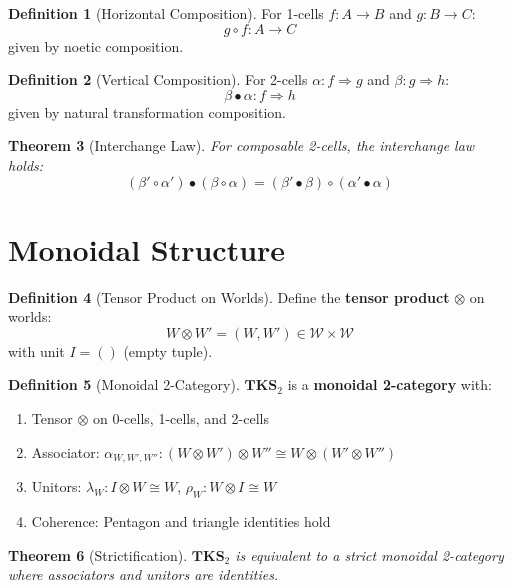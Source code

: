 \documentclass[11pt,twoside,openright]{book}
\theoremstyle{definition}
\newtheorem{definition}{Definition}[chapter]
\theoremstyle{plain}
\newtheorem{theorem}[definition]{Theorem}
\theoremstyle{remark}
\newcommand{\Worlds}{\mathcal{W}}
\begin{document}
\begin{definition}[Horizontal Composition]
\label{def:horizontal-comp}
For 1-cells $f : A \to B$ and $g : B \to C$:
\[
g \circ f : A \to C
\]
given by noetic composition.
\end{definition}

\begin{definition}[Vertical Composition]
\label{def:vertical-comp}
For 2-cells $\alpha : f \Rightarrow g$ and $\beta : g \Rightarrow h$:
\[
\beta \bullet \alpha : f \Rightarrow h
\]
given by natural transformation composition.
\end{definition}

\begin{theorem}[Interchange Law]
\label{thm:interchange}
For composable 2-cells, the interchange law holds:
\[
(\beta' \circ \alpha') \bullet (\beta \circ \alpha) = (\beta' \bullet \beta) \circ (\alpha' \bullet \alpha)
\]
\end{theorem}

\section{Monoidal Structure}

\begin{definition}[Tensor Product on Worlds]
\label{def:tensor-worlds}
Define the \textbf{tensor product} $\otimes$ on worlds:
\[
W \otimes W' = (W, W') \in \Worlds \times \Worlds
\]
with unit $I = ()$ (empty tuple).
\end{definition}

\begin{definition}[Monoidal 2-Category]
\label{def:monoidal-2cat}
$\mathbf{TKS}_2$ is a \textbf{monoidal 2-category} with:
\begin{enumerate}
  \item Tensor $\otimes$ on 0-cells, 1-cells, and 2-cells
  \item Associator: $\alpha_{W,W',W''} : (W \otimes W') \otimes W'' \cong W \otimes (W' \otimes W'')$
  \item Unitors: $\lambda_W : I \otimes W \cong W$, $\rho_W : W \otimes I \cong W$
  \item Coherence: Pentagon and triangle identities hold
\end{enumerate}
\end{definition}

\begin{theorem}[Strictification]
\label{thm:strictification}
$\mathbf{TKS}_2$ is equivalent to a strict monoidal 2-category where associators and unitors are identities.
\end{theorem}
\end{document}
